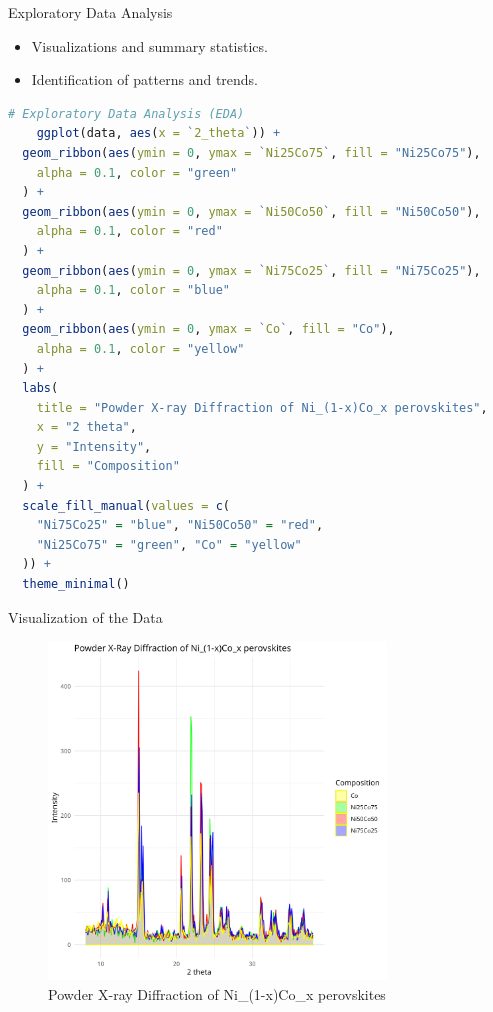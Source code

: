 \documentclass{beamer}
\begin{document}
\begin{frame}[fragile]{Exploratory Data Analysis}
    \begin{itemize}
        \item Visualizations and summary statistics.
        \item Identification of patterns and trends.
    \end{itemize}

    \begin{lstlisting}[language=R, basicstyle=\tiny\ttfamily]
    # Exploratory Data Analysis (EDA)
    ggplot(data, aes(x = `2_theta`)) +
  geom_ribbon(aes(ymin = 0, ymax = `Ni25Co75`, fill = "Ni25Co75"),
    alpha = 0.1, color = "green"
  ) +
  geom_ribbon(aes(ymin = 0, ymax = `Ni50Co50`, fill = "Ni50Co50"),
    alpha = 0.1, color = "red"
  ) +
  geom_ribbon(aes(ymin = 0, ymax = `Ni75Co25`, fill = "Ni75Co25"),
    alpha = 0.1, color = "blue"
  ) +
  geom_ribbon(aes(ymin = 0, ymax = `Co`, fill = "Co"),
    alpha = 0.1, color = "yellow"
  ) +
  labs(
    title = "Powder X-ray Diffraction of Ni_(1-x)Co_x perovskites",
    x = "2 theta",
    y = "Intensity",
    fill = "Composition"
  ) +
  scale_fill_manual(values = c(
    "Ni75Co25" = "blue", "Ni50Co50" = "red",
    "Ni25Co75" = "green", "Co" = "yellow"
  )) +
  theme_minimal()
    \end{lstlisting}
\end{frame}

\begin{frame}{Visualization of the Data}
    \begin{figure}
        \centering
        \includegraphics[width=0.8\textwidth]{../plot/graph_nb.png}
        \caption{Powder X-ray Diffraction of Ni\_(1-x)Co\_x perovskites}
        \label{fig:xrd}
    \end{figure}
\end{frame}
\end{document}
